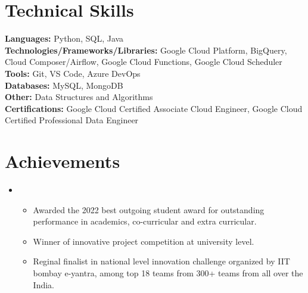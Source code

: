 \documentclass[letterpaper,11pt]{article}
\newcommand{\resumeItem}[1]{
  \item\small{
	{#1 \vspace{-2pt}}
  }
}
\newcommand{\resumeItemListStart}{\begin{itemize}}
\newcommand{\resumeItemListEnd}{\end{itemize}\vspace{-5pt}}
\begin{document}

\section{Technical Skills}

 \begin{itemize}[leftmargin=0.20in, label={}]
 
	\small{\item{
 
 	\textbf{Languages: }{Python, SQL, Java} \\
  
 	\textbf{Technologies/Frameworks/Libraries: }{Google Cloud Platform, BigQuery, Cloud Composer/Airflow, Google Cloud Functions, Google Cloud Scheduler} \\
  
 	\textbf{Tools: }{Git, VS Code, Azure DevOps} \\
  
 	\textbf{Databases: }{MySQL, MongoDB } \\
  
 	\textbf{Other: }{Data Structures and Algorithms} \\
  
        \textbf{Certifications: }{Google Cloud Certified Associate Cloud Engineer, Google Cloud Certified Professional Data Engineer} \\
        
	}}

 \end{itemize}
 
 \vspace{-16pt}


\section{Achievements}

\vspace{2pt}

 \begin{itemize}[leftmargin=0.00in, label={}]
 
 \item
	\resumeItemListStart
 
    	\resumeItem{Awarded the 2022 best outgoing student award for outstanding performance in academics, co-curricular and extra curricular.}
     
    	\resumeItem{Winner of innovative project competition at university level.}
     
    	\resumeItem{Reginal finalist in national level innovation challenge organized by IIT bombay e-yantra, among top 18 teams from 300+ teams from all over the India.}
     
  	\resumeItemListEnd
   
 \end{itemize}
 
\end{document}
